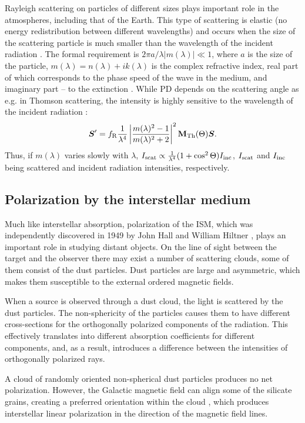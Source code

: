 Rayleigh scattering on particles of different sizes plays important role in the atmospheres, including that of the Earth.
This type of scattering is elastic (no energy redistribution between different wavelengths) and occurs when the size of the scattering particle is much smaller than the wavelength of the incident radiation \citep{AbsorbScat}. 
The formal requirement is $2\pi a/\lambda |m(\lambda)| \ll 1$, where $a$ is the size of the particle, $m(\lambda) = n(\lambda) + ik(\lambda)$ is the complex refractive index, real part of which corresponds to the phase speed of the wave in the medium, and imaginary part -- to the extinction \citep{LightScat}.
While \gls{PD} depends on the scattering angle as e.g. in Thomson scattering, the intensity is highly sensitive to the wavelength of the incident radiation \citep{AbsorbScat}:
\begin{equation}
    \boldsymbol{S}^\prime = f_{\mathrm{R}} \frac{1}{\lambda^4}\left|\frac{m(\lambda)^2 - 1}{m(\lambda)^2 + 2}\right|^2\mathbf{M}_{\mathrm{Th}}(\Theta)\boldsymbol{S}.
\end{equation}
Thus, if $m(\lambda)$ varies slowly with $\lambda$, $I_{\mathrm{scat}} \propto \frac{1}{\lambda^4}(1 + \cos^2\Theta) I_{\mathrm{inc}}$, $I_{\mathrm{scat}}$ and $I_{\mathrm{inc}}$ being scattered and incident radiation intensities, respectively. 


\subsection{Polarization by the interstellar medium}
\label{sec:pol_ism}
Much like interstellar absorption, polarization of the \gls{ISM}, which was independently discovered in 1949 by John Hall \citep{Hall1949} and William Hiltner \citep{Hiltner1949}, plays an important role in studying distant objects.
On the line of sight between the target and the observer there may exist a number of scattering clouds, some of them consist of the dust particles.
Dust particles are large and asymmetric, which makes them susceptible to the external ordered magnetic fields.

When a source is observed through a dust cloud, the light is scattered by the dust particles.
The non-sphericity of the particles causes them to have different cross-sections for the orthogonally polarized components of the radiation.
This effectively translates into different absorption coefficients for different components, and, as a result, introduces a difference between the intensities of orthogonally polarized rays.

A cloud of randomly oriented non-spherical dust particles produces no net polarization.
However, the Galactic magnetic field can align some of the silicate grains, creating a preferred orientation within the cloud \citep{Mathis1986, Li1997}, which produces interstellar linear polarization in the direction of the magnetic field lines.


